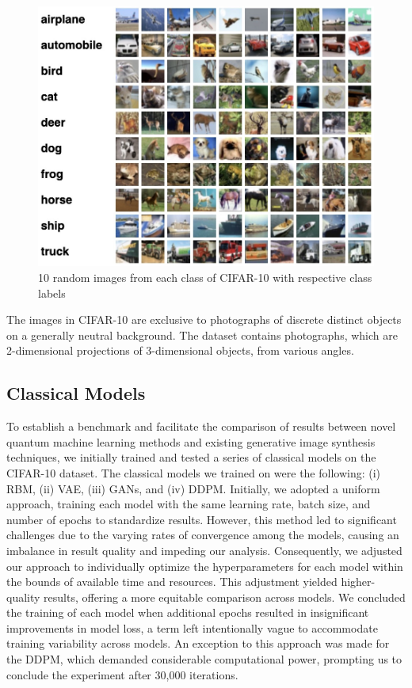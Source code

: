 \documentclass[%
 reprint,
 amsmath,amssymb,
 aps,
]{revtex4-2}
\begin{document}
\begin{figure}[h]
    \includegraphics[width=0.9\columnwidth]{cifar10.jpeg}
    \caption{\label{fig:cifar10} 10 random images from each class of CIFAR-10 with respective class labels \cite{CIFAR}}
\end{figure}


The images in CIFAR-10 are exclusive to photographs of discrete distinct objects on a generally neutral background. The dataset contains photographs, which are 2-dimensional projections of 3-dimensional objects, from various angles.

\subsection{Classical Models}

To establish a benchmark and facilitate the comparison of results between novel quantum machine learning methods and existing generative image synthesis techniques, we initially trained and tested a series of classical models on the CIFAR-10 dataset. The classical models we trained on were the following: (i) RBM, (ii) VAE, (iii) GANs, and (iv) DDPM. Initially, we adopted a uniform approach, training each model with the same learning rate, batch size, and number of epochs to standardize results. However, this method led to significant challenges due to the varying rates of convergence among the models, causing an imbalance in result quality and impeding our analysis. Consequently, we adjusted our approach to individually optimize the hyperparameters for each model within the bounds of available time and resources. This adjustment yielded higher-quality results, offering a more equitable comparison across models. We concluded the training of each model when additional epochs resulted in insignificant improvements in model loss, a term left intentionally vague to accommodate training variability across models. An exception to this approach was made for the DDPM, which demanded considerable computational power, prompting us to conclude the experiment after 30,000 iterations.
\end{document}
